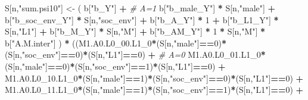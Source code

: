 \documentclass[
]{book}
\newenvironment{Shaded}{\begin{snugshade}}{\end{snugshade}}
\newcommand{\CommentTok}[1]{\textcolor[rgb]{0.56,0.35,0.01}{\textit{#1}}}
\newcommand{\DecValTok}[1]{\textcolor[rgb]{0.00,0.00,0.81}{#1}}
\newcommand{\NormalTok}[1]{#1}
\newcommand{\OtherTok}[1]{\textcolor[rgb]{0.56,0.35,0.01}{#1}}
\newcommand{\SpecialCharTok}[1]{\textcolor[rgb]{0.81,0.36,0.00}{\textbf{#1}}}
\newcommand{\StringTok}[1]{\textcolor[rgb]{0.31,0.60,0.02}{#1}}
\begin{document}
\begin{Shaded}
\begin{Highlighting}[]
\NormalTok{    S[n,}\StringTok{"sum.psi10"}\NormalTok{] }\OtherTok{\textless{}{-}}\NormalTok{  ( b[}\StringTok{"b\_Y"}\NormalTok{] }\SpecialCharTok{+}                                            \CommentTok{\# A=1}
\NormalTok{                             b[}\StringTok{"b\_male\_Y"}\NormalTok{] }\SpecialCharTok{*}\NormalTok{ S[n,}\StringTok{"male"}\NormalTok{] }\SpecialCharTok{+} 
\NormalTok{                             b[}\StringTok{"b\_soc\_env\_Y"}\NormalTok{] }\SpecialCharTok{*}\NormalTok{ S[n,}\StringTok{"soc\_env"}\NormalTok{] }\SpecialCharTok{+} 
\NormalTok{                             b[}\StringTok{"b\_A\_Y"}\NormalTok{] }\SpecialCharTok{*} \DecValTok{1} \SpecialCharTok{+} 
\NormalTok{                             b[}\StringTok{"b\_L1\_Y"}\NormalTok{] }\SpecialCharTok{*}\NormalTok{ S[n,}\StringTok{"L1"}\NormalTok{] }\SpecialCharTok{+}
\NormalTok{                             b[}\StringTok{"b\_M\_Y"}\NormalTok{] }\SpecialCharTok{*}\NormalTok{ S[n,}\StringTok{"M"}\NormalTok{] }\SpecialCharTok{+}
\NormalTok{                             b[}\StringTok{"b\_AM\_Y"}\NormalTok{] }\SpecialCharTok{*} \DecValTok{1} \SpecialCharTok{*}\NormalTok{ S[n,}\StringTok{"M"}\NormalTok{] }\SpecialCharTok{*}\NormalTok{ b[}\StringTok{"A.M.inter"}\NormalTok{] ) }\SpecialCharTok{*}
\NormalTok{      ((M1.A0.L0\_00.L1\_0}\SpecialCharTok{*}\NormalTok{(S[n,}\StringTok{"male"}\NormalTok{]}\SpecialCharTok{==}\DecValTok{0}\NormalTok{)}\SpecialCharTok{*}\NormalTok{(S[n,}\StringTok{"soc\_env"}\NormalTok{]}\SpecialCharTok{==}\DecValTok{0}\NormalTok{)}\SpecialCharTok{*}\NormalTok{(S[n,}\StringTok{"L1"}\NormalTok{]}\SpecialCharTok{==}\DecValTok{0}\NormalTok{) }\SpecialCharTok{+} \CommentTok{\# A\textquotesingle{}=0}
\NormalTok{          M1.A0.L0\_01.L1\_0}\SpecialCharTok{*}\NormalTok{(S[n,}\StringTok{"male"}\NormalTok{]}\SpecialCharTok{==}\DecValTok{0}\NormalTok{)}\SpecialCharTok{*}\NormalTok{(S[n,}\StringTok{"soc\_env"}\NormalTok{]}\SpecialCharTok{==}\DecValTok{1}\NormalTok{)}\SpecialCharTok{*}\NormalTok{(S[n,}\StringTok{"L1"}\NormalTok{]}\SpecialCharTok{==}\DecValTok{0}\NormalTok{) }\SpecialCharTok{+}
\NormalTok{          M1.A0.L0\_10.L1\_0}\SpecialCharTok{*}\NormalTok{(S[n,}\StringTok{"male"}\NormalTok{]}\SpecialCharTok{==}\DecValTok{1}\NormalTok{)}\SpecialCharTok{*}\NormalTok{(S[n,}\StringTok{"soc\_env"}\NormalTok{]}\SpecialCharTok{==}\DecValTok{0}\NormalTok{)}\SpecialCharTok{*}\NormalTok{(S[n,}\StringTok{"L1"}\NormalTok{]}\SpecialCharTok{==}\DecValTok{0}\NormalTok{) }\SpecialCharTok{+} 
\NormalTok{          M1.A0.L0\_11.L1\_0}\SpecialCharTok{*}\NormalTok{(S[n,}\StringTok{"male"}\NormalTok{]}\SpecialCharTok{==}\DecValTok{1}\NormalTok{)}\SpecialCharTok{*}\NormalTok{(S[n,}\StringTok{"soc\_env"}\NormalTok{]}\SpecialCharTok{==}\DecValTok{1}\NormalTok{)}\SpecialCharTok{*}\NormalTok{(S[n,}\StringTok{"L1"}\NormalTok{]}\SpecialCharTok{==}\DecValTok{0}\NormalTok{) }\SpecialCharTok{+}

\end{Highlighting}
\end{Shaded}
\end{document}
